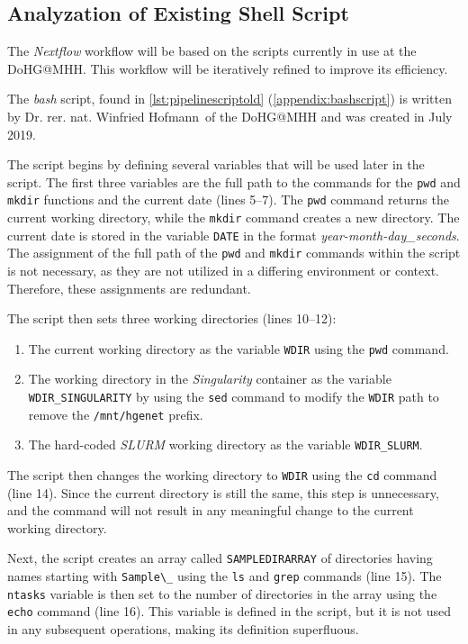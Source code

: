 \subsection{Analyzation of Existing Shell Script}

The \textit{Nextflow} workflow will be based on the scripts currently in use at the \ac{DoHG@MHH}. This workflow will be iteratively refined to improve its efficiency.

The \textit{bash} script, found in \cref{lst:pipelinescriptold} (\cref{appendix:bashscript}) is written by 
Dr. rer. nat. Winfried Hofmann\, of the \ac{DoHG@MHH} and was created in July 2019.

The script begins by defining several variables that will be used later in the script. The first three variables are the full path to the commands for the \lstinline{pwd} and \lstinline{mkdir} functions and the current date (lines \numrange{5}{7}). The \lstinline{pwd} command returns the current working directory, while the \lstinline{mkdir} command creates a new directory. The current date is stored in the variable \lstinline{DATE} in the format \textit{year-month-day\_seconds}. The assignment of the full path of the \lstinline{pwd} and \lstinline{mkdir} commands within the script is not necessary, as they are not utilized in a differing environment or context. Therefore, these assignments are redundant.

The script then sets three working directories (lines \numrange{10}{12}):
\begin{enumerate}
    \item The current working directory as the variable \lstinline{WDIR} using the \lstinline{pwd} command.
    \item The working directory in the \textit{Singularity} container as the variable \lstinline{WDIR_SINGULARITY} by using the \lstinline{sed} command to modify the \lstinline{WDIR} path to remove the \lstinline{/mnt/hgenet} prefix.
    \item The hard-coded \textit{\ac{SLURM}} working directory as the variable \lstinline{WDIR_SLURM}.
\end{enumerate}

The script then changes the working directory to \lstinline{WDIR} using the \lstinline{cd} command (line \num{14}). Since the current directory is still the same, this step is unnecessary, and the command will not result in any meaningful change to the current working directory.

Next, the script creates an array called \lstinline{SAMPLEDIRARRAY} of directories having names starting with \lstinline{Sample\_} using the \lstinline{ls} and \lstinline{grep} commands (line \num{15}). The \lstinline{ntasks} variable is then set to the number of directories in the array using the \lstinline{echo} command (line \num{16}). This variable is defined in the script, but it is not used in any subsequent operations, making its definition superfluous.

